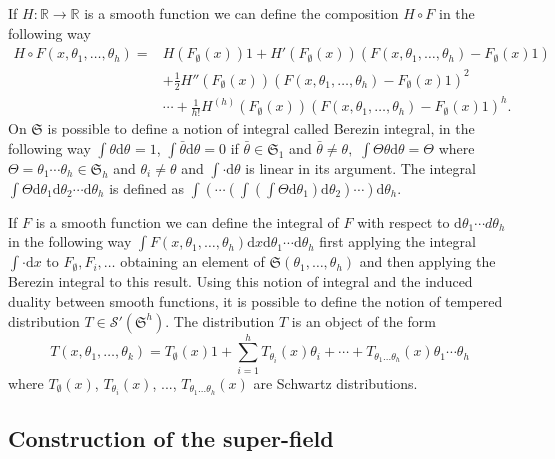 \documentclass[a4paper,10pt]{article}
\newcommand{\mathd}{\mathrm{d}}
\newcommand{\textdots}[0]{...}
\begin{document}
If $H : \mathbb{R} \rightarrow \mathbb{R}$ is a smooth function we can define
the composition $H \circ F$ in the following way
\[ \begin{array}{ll}
     H \circ F (x, \theta_1, \ldots, \theta_h) = & H (F_{\emptyset} (x)) 1 +
     H' (F_{\emptyset} (x)) (F (x, \theta_1, \ldots, \theta_h) - F_{\emptyset}
     (x) 1)\\
     & + \frac{1}{2} H'' (F_{\emptyset} (x)) (F (x, \theta_1, \ldots,
     \theta_h) - F_{\emptyset} (x) 1)^2\\
     & \cdots + \frac{1}{h!} H^{(h)} (F_{\emptyset} (x)) (F (x, \theta_1,
     \ldots, \theta_h) - F_{\emptyset} (x) 1)^h .
   \end{array} \]
On $\mathfrak{S}$ is possible to define a notion of integral called Berezin
integral, in the following way $\int \theta \mathd \theta_{} = 1$, $\int
\bar{\theta} \mathd \theta = 0$ if $\bar{\theta} \in \mathfrak{S}_1$ and
$\bar{\theta} \not = \theta,$ $\int \Theta \theta \mathd \theta = \Theta$
where $\Theta = \theta_1 \cdots \theta_h \in \mathfrak{S}_h$ and $\theta_i
\not = \theta$ and $\int \cdot \mathd \theta$ is linear in its argument. The
integral $\int \Theta \mathd \theta_1 \mathd \theta_2 \cdots \mathd \theta_h$
is defined as $\int \left( \cdots \left( \int \left( \int \Theta \mathd
\theta_1 \right) \mathd \theta_2 \right) \cdots \right) \mathd \theta_h$.

If $F$ is a smooth function we can define the integral of $F$ with respect to
$\mathd \theta_1 \cdots d \theta_h$ in the following way $\int F (x, \theta_1,
\ldots, \theta_h) \mathd x \mathd \theta_1 \cdots \mathd \theta_h$ first
applying the integral $\int \cdot \mathd x$ to $F_{\emptyset}, F_i, \ldots$
obtaining an element of $\mathfrak{S} (\theta_1, \ldots, \theta_h)$ and then
applying the Berezin integral to this result. Using this notion of integral
and the induced duality between smooth functions, it is possible to define the
notion of tempered distribution $T \in \mathcal{S}' (\mathfrak{S}^h)$. The
distribution $T$ is an object of the form
\[ T (x, \theta_1, \ldots, \theta_k) = T_{\emptyset} (x) 1 + \sum_{i = 1}^h
   T_{\theta_i} (x) \theta_i + \cdots + T_{\theta_1 \ldots \theta_h} (x)
   \theta_1 \cdots \theta_h \]
where $T_{\emptyset} (x)$, $T_{\theta_i} (x)$, {\textdots}, $T_{\theta_1
\ldots \theta_h} (x)$ are Schwartz distributions.

\subsection{Construction of the super-field}
\end{document}
